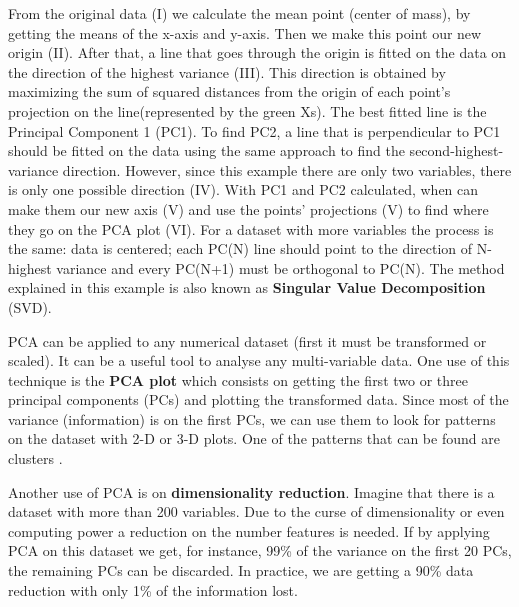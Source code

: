 From the original data (I) we calculate the mean point (center of mass), by getting the means of the x-axis and y-axis. Then we make this point our new origin (II). After that, a line that goes through the origin is fitted on the data on the direction of the highest variance (III). This direction is obtained by maximizing the sum of squared distances from the origin of each point's projection on the line(represented by the green Xs). The best fitted line is the Principal Component 1 (PC1). To find PC2, a line that is perpendicular to PC1 should be fitted on the data using the same approach to find the second-highest-variance direction. However, since this example there are only two variables, there is only one possible direction (IV). With PC1 and PC2 calculated, when can make them our new axis (V) and use the points' projections (V) to find where they go on the PCA plot (VI). For a dataset with more variables the process is the same: data is centered; each PC(N) line should point to the direction of N-highest variance and every PC(N+1) must be orthogonal to PC(N). The method explained in this example is also known as \textbf{Singular Value Decomposition} (SVD).

PCA can be applied to any numerical dataset \cite{wold1987principal} (first it must be transformed or scaled). It can be a useful tool to analyse any multi-variable data. One use of this technique is the \textbf{PCA plot} which consists on getting the first two or three principal components (PCs) and plotting the transformed data. Since most of the variance (information) is on the first PCs, we can use them to look for patterns on the dataset with 2-D or 3-D plots. One of the patterns that can be found are clusters \cite{ding2004k}. 

Another use of PCA is on \textbf{dimensionality reduction}. Imagine that there is a dataset with more than 200 variables. Due to the curse of dimensionality \cite{Bellman:2010:DP:1893145} or even computing power a reduction on the number features is needed. If by applying PCA on this dataset we get, for instance, 99\% of the variance on the first 20 PCs, the remaining PCs can be discarded. In practice, we are getting a 90\% data reduction with only 1\% of the information lost.





